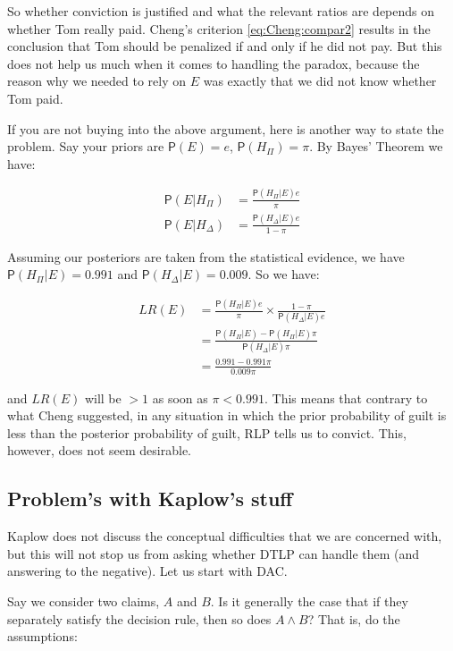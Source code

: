 \documentclass[10pt,dvipsnames,enabledeprecatedfontcommands]{scrartcl}
\newcommand{\et}{\wedge}
\newcommand{\pr}[1]{\mathsf{P}(#1)}
\begin{document}
So whether conviction is justified and what the relevant ratios are
depends on whether Tom really paid. Cheng's criterion
\eqref{eq:Cheng:compar2} results in the conclusion that Tom should be
penalized if and only if he did not pay. But this does not help us much
when it comes to handling the paradox, because the reason why we needed
to rely on \(E\) was exactly that we did not know whether Tom paid.

If you are not buying into the above argument, here is another way to
state the problem. Say your priors are \(\pr{E}=e\), \(\pr{H_\Pi}=\pi\).
By Bayes' Theorem we have:

\begin{align*}
 \pr{E\vert H_\Pi} & = \frac{\pr{H_\Pi\vert E}e}{\pi}\\
 \pr{E\vert H_\Delta} & = \frac{\pr{H_\Delta\vert E}e}{1-\pi}
 \end{align*}

\noindent Assuming our posteriors are taken from the statistical
evidence, we have \(\pr{H_\Pi\vert E}=0.991\) and
\(\pr{H_\Delta\vert E }=0.009\). So we have:

\begin{align}
 \label{eq:Cheng_lre} LR(E) & = \frac{\pr{H_\Pi\vert E}e}{\pi}\times \frac{1-\pi}{\pr{H_\Delta\vert E}e}\\ \nonumber
 & = \frac{\pr{H_\Pi \vert E} - \pr{H_\Pi\vert E}\pi}{\pr{H_\Delta\vert E}\pi}\\ \nonumber
 & = \frac{0.991-0.991\pi}{0.009\pi}
 \end{align}

\noindent and \(LR(E)\) will be \(>1\) as soon as \(\pi<0.991\). This
means that contrary to what Cheng suggested, in any situation in which
the prior probability of guilt is less than the posterior probability of
guilt, RLP tells us to convict. This, however, does not seem desirable.

\subsection{Problem's with Kaplow's
stuff}\label{problems-with-kaplows-stuff}

Kaplow does not discuss the conceptual difficulties that we are
concerned with, but this will not stop us from asking whether DTLP can
handle them (and answering to the negative). Let us start with DAC.

Say we consider two claims, \(A\) and \(B\). Is it generally the case
that if they separately satisfy the decision rule, then so does
\(A\et B\)? That is, do the assumptions:
\end{document}
